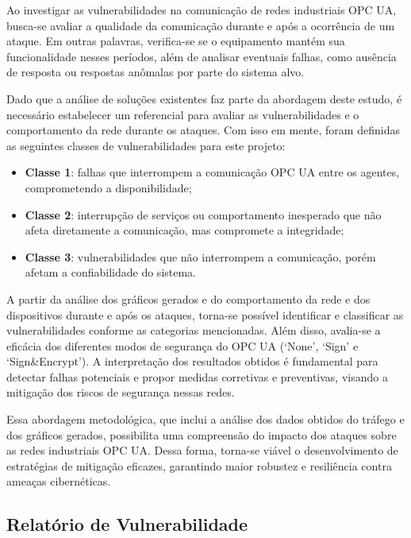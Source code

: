         Ao investigar as vulnerabilidades na comunicação de redes industriais OPC UA, busca-se avaliar a qualidade da comunicação durante e após a ocorrência de um ataque. Em outras palavras, verifica-se se o equipamento mantém sua funcionalidade nesses períodos, além de analisar eventuais falhas, como ausência de resposta ou respostas anômalas por parte do sistema alvo.
        
        Dado que a análise de soluções existentes faz parte da abordagem deste estudo, é necessário estabelecer um referencial para avaliar as vulnerabilidades e o comportamento da rede durante os ataques. Com isso em mente, foram definidas as seguintes classes de vulnerabilidades para este projeto:
        
        \begin{itemize}
            \item \textbf{Classe 1}: falhas que interrompem a comunicação OPC UA entre os agentes, comprometendo a disponibilidade;
            \item \textbf{Classe 2}: interrupção de serviços ou comportamento inesperado que não afeta diretamente a comunicação, mas compromete a integridade;
            \item \textbf{Classe 3}: vulnerabilidades que não interrompem a comunicação, porém afetam a confiabilidade do sistema.
        \end{itemize}
        
        A partir da análise dos gráficos gerados e do comportamento da rede e dos dispositivos durante e após os ataques, torna-se possível identificar e classificar as vulnerabilidades conforme as categorias mencionadas. Além disso, avalia-se a eficácia dos diferentes modos de segurança do OPC UA (`None', `Sign' e `Sign\&Encrypt'). A interpretação dos resultados obtidos é fundamental para detectar falhas potenciais e propor medidas corretivas e preventivas, visando a mitigação dos riscos de segurança nessas redes.
        
        Essa abordagem metodológica, que inclui a análise dos dados obtidos do tráfego e dos gráficos gerados, possibilita uma compreensão do impacto dos ataques sobre as redes industriais OPC UA. Dessa forma, torna-se viável o desenvolvimento de estratégias de mitigação eficazes, garantindo maior robustez e resiliência contra ameaças cibernéticas.
    
    
    \subsection{Relatório de Vulnerabilidade}


